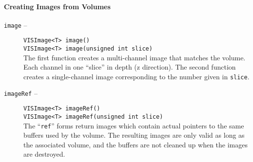 \paragraph{Creating Images from Volumes}
\begin{description}
\item[{\tt image} --]
{\tt VISImage<T> image()}\\
{\tt VISImage<T> image(unsigned int slice)}\\
The first function creates a multi-channel image that matches the volume.
Each channel in one ``slice'' in depth (z direction).
The second function creates a single-channel image 
corresponding to the number given in {\tt slice}.
\item[{\tt imageRef} --]
{\tt VISImage<T> imageRef()}\\
{\tt VISImage<T> imageRef(unsigned int slice)}\\
The ``{\tt ref}'' forms return images which contain actual pointers to the 
same buffers used by the volume.  The resulting images are only valid as
long as the associated volume, and the buffers are not cleaned up when 
the images are destroyed.
\end{description}

